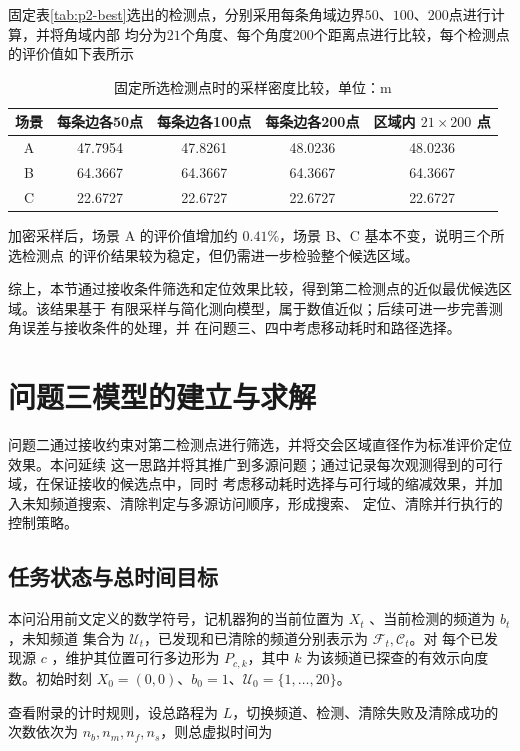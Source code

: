 \documentclass[withoutpreface,bwprint]{cumcmthesis} %
\begin{document}
固定表\ref{tab:p2-best}选出的检测点，分别采用每条角域边界$50$、$100$、$200$点进行计算，并将角域内部
均分为$21$个角度、每个角度$200$个距离点进行比较，每个检测点的评价值如下表所示

\begin{table}[H]
\centering
\caption{固定所选检测点时的采样密度比较，单位：m}\label{tab:p2-sampling}
\begin{tabular}{ccccc}
\toprule
场景 & 每条边各50点 & 每条边各100点 & 每条边各200点 & 区域内 $21\times200$ 点\\
\midrule
A & 47.7954 & 47.8261 & 48.0236 & 48.0236\\
B & 64.3667 & 64.3667 & 64.3667 & 64.3667\\
C & 22.6727 & 22.6727 & 22.6727 & 22.6727\\
\bottomrule
\end{tabular}
\end{table}

加密采样后，场景 A 的评价值增加约 $0.41\%$，场景 B、C 基本不变，说明三个所选检测点
的评价结果较为稳定，但仍需进一步检验整个候选区域。

综上，本节通过接收条件筛选和定位效果比较，得到第二检测点的近似最优候选区域。该结果基于
有限采样与简化测向模型，属于数值近似；后续可进一步完善测角误差与接收条件的处理，并
在问题三、四中考虑移动耗时和路径选择。

\section{问题三模型的建立与求解}

问题二通过接收约束对第二检测点进行筛选，并将交会区域直径作为标准评价定位效果。本问延续
这一思路并将其推广到多源问题；通过记录每次观测得到的可行域，在保证接收的候选点中，同时
考虑移动耗时选择与可行域的缩减效果，并加入未知频道搜索、清除判定与多源访问顺序，形成搜索、
定位、清除并行执行的控制策略。

\subsection{任务状态与总时间目标}

本问沿用前文定义的数学符号，记机器狗的当前位置为 $X_t$ 、当前检测的频道为 $b_t$ ，未知频道
集合为 $\mathcal U_t$，已发现和已清除的频道分别表示为 $\mathcal F_t,\mathcal C_t$。对
每个已发现源 $c$ ，维护其位置可行多边形为 $P_{c,k}$，其中 $k$ 为该频道已探查的有效示向度
数。初始时刻 $X_0=(0,0)$、$b_0=1$、$\mathcal U_0=\{1,\ldots,20\}$。

查看附录的计时规则，设总路程为 $L$，切换频道、检测、清除失败及清除成功的次数依次为
$n_b,n_m,n_f,n_s$，则总虚拟时间为
\end{document}

